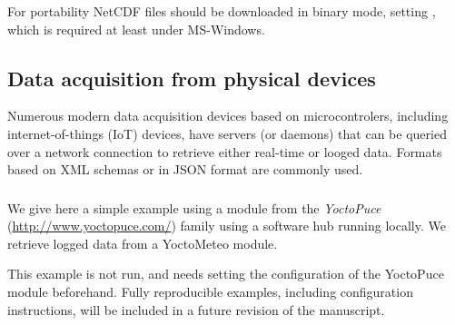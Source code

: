 \documentclass[krantz2,ChapterTOCs]{krantz}\usepackage{knitr}
\newcommand{\href}[2]{\emph{#2} (\url{#1})}
\begin{document}
\begin{knitrout}\footnotesize
{}\color{fgcolor}\begin{kframe}
\begin{alltt}
 \hlkwb{<-} \hlstd{(}\hlstd{,}
                \hlstd{,}
                 \hlstd{=} \hlstd{)}
 \hlkwb{<-} \hlstd{(}\hlstd{)}
\end{alltt}
\end{kframe}
\end{knitrout}

\begin{warningbox}
For portability NetCDF files should be downloaded in binary mode, setting , which is required at least under MS-Windows.
\end{warningbox}

\subsection{Data acquisition from physical devices}\label{sec:data:acquisition}

Numerous modern data acquisition devices based on microcontrolers, including internet-of-things (IoT) devices, have servers (or daemons) that can be queried over a network connection to retrieve either real-time or looged data. Formats based on XML schemas or in JSON format are commonly used.

\subsubsection[jsonlite]{}

We give here a simple example using a module from the \href{http://www.yoctopuce.com/}{YoctoPuce} family using a software hub running locally. We retrieve logged data from a YoctoMeteo module.

\begin{infobox}
This example is not run, and needs setting the configuration of the YoctoPuce module beforehand. Fully reproducible examples, including configuration instructions, will be included in a future revision of the manuscript.
\end{infobox}
\end{document}
